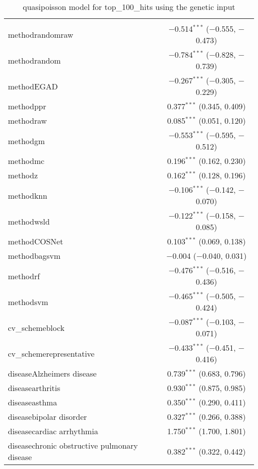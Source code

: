 
\begin{table}[!htbp] \centering 
  \caption{quasipoisson model for top_100_hits using the genetic input} 
  \label{} 
\begin{tabular}{@{\extracolsep{5pt}}lc} 
\\[-1.8ex]\hline 
\hline \\[-1.8ex] 
 methodrandomraw & $-$0.514$^{***}$ ($-$0.555, $-$0.473) \\ 
  methodrandom & $-$0.784$^{***}$ ($-$0.828, $-$0.739) \\ 
  methodEGAD & $-$0.267$^{***}$ ($-$0.305, $-$0.229) \\ 
  methodppr & 0.377$^{***}$ (0.345, 0.409) \\ 
  methodraw & 0.085$^{***}$ (0.051, 0.120) \\ 
  methodgm & $-$0.553$^{***}$ ($-$0.595, $-$0.512) \\ 
  methodmc & 0.196$^{***}$ (0.162, 0.230) \\ 
  methodz & 0.162$^{***}$ (0.128, 0.196) \\ 
  methodknn & $-$0.106$^{***}$ ($-$0.142, $-$0.070) \\ 
  methodwsld & $-$0.122$^{***}$ ($-$0.158, $-$0.085) \\ 
  methodCOSNet & 0.103$^{***}$ (0.069, 0.138) \\ 
  methodbagsvm & $-$0.004 ($-$0.040, 0.031) \\ 
  methodrf & $-$0.476$^{***}$ ($-$0.516, $-$0.436) \\ 
  methodsvm & $-$0.465$^{***}$ ($-$0.505, $-$0.424) \\ 
  cv\_schemeblock & $-$0.087$^{***}$ ($-$0.103, $-$0.071) \\ 
  cv\_schemerepresentative & $-$0.433$^{***}$ ($-$0.451, $-$0.416) \\ 
  diseaseAlzheimers disease & 0.739$^{***}$ (0.683, 0.796) \\ 
  diseasearthritis & 0.930$^{***}$ (0.875, 0.985) \\ 
  diseaseasthma & 0.350$^{***}$ (0.290, 0.411) \\ 
  diseasebipolar disorder & 0.327$^{***}$ (0.266, 0.388) \\ 
  diseasecardiac arrhythmia & 1.750$^{***}$ (1.700, 1.801) \\ 
  diseasechronic obstructive pulmonary disease & 0.382$^{***}$ (0.322, 0.442) \\ 

\end{tabular}
\end{table}

